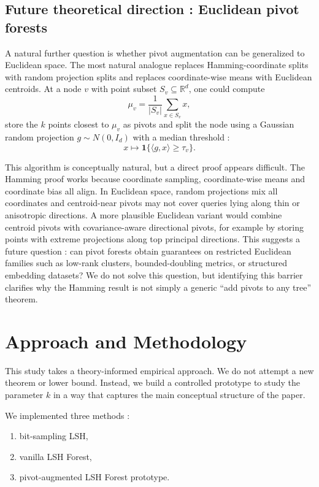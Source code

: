 \documentclass[11pt]{article}
\begin{document}
\subsection{Future theoretical direction : Euclidean pivot forests}

A natural further question is whether pivot augmentation can be generalized to Euclidean space. The most natural analogue replaces Hamming-coordinate splits with random projection splits and replaces coordinate-wise means with Euclidean centroids. At a node $v$ with point subset $S_v \subseteq \mathbb{R}^d$, one could compute
\[
    \mu_v = \frac{1}{|S_v|}\sum_{x \in S_v}x,
\]
store the $k$ points closest to $\mu_v$ as pivots and split the node using a Gaussian random projection $g \sim N(0,I_d)$ with a median threshold :
\[
    x \mapsto \mathbf{1}\{\langle g,x\rangle \ge \tau_v\}.
\]

This algorithm is conceptually natural, but a direct proof appears difficult. The Hamming proof works because coordinate sampling, coordinate-wise means and coordinate bias all align. In Euclidean space, random projections mix all coordinates and centroid-near pivots may not cover queries lying along thin or anisotropic directions. A more plausible Euclidean variant would combine centroid pivots with covariance-aware directional pivots, for example by storing points with extreme projections along top principal directions. This suggests a future question : can pivot forests obtain guarantees on restricted Euclidean families such as low-rank clusters, bounded-doubling metrics, or structured embedding datasets? We do not solve this question, but identifying this barrier clarifies why the Hamming result is not simply a generic ``add pivots to any tree'' theorem.

\section{Approach and Methodology}

This study takes a theory-informed empirical approach. We do not attempt a new theorem or lower bound. Instead, we build a controlled prototype to study the parameter $k$ in a way that captures the main conceptual structure of the paper.

We implemented three methods :
\begin{enumerate}[leftmargin=*]
    \item bit-sampling LSH,
    \item vanilla LSH Forest,
    \item pivot-augmented LSH Forest prototype.
\end{enumerate}
\end{document}
